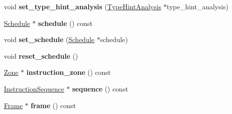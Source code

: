 \begin{DoxyCompactItemize}
\item 
void {\bfseries set\+\_\+type\+\_\+hint\+\_\+analysis} (\hyperlink{classv8_1_1internal_1_1compiler_1_1_type_hint_analysis}{Type\+Hint\+Analysis} $\ast$type\+\_\+hint\+\_\+analysis)\hypertarget{classv8_1_1internal_1_1compiler_1_1_pipeline_data_a51275dd02898936db7e2093a30fa54d7}{}\label{classv8_1_1internal_1_1compiler_1_1_pipeline_data_a51275dd02898936db7e2093a30fa54d7}

\item 
\hyperlink{classv8_1_1internal_1_1compiler_1_1_schedule}{Schedule} $\ast$ {\bfseries schedule} () const \hypertarget{classv8_1_1internal_1_1compiler_1_1_pipeline_data_a116235f2734a371c2fcb21682d3e6599}{}\label{classv8_1_1internal_1_1compiler_1_1_pipeline_data_a116235f2734a371c2fcb21682d3e6599}

\item 
void {\bfseries set\+\_\+schedule} (\hyperlink{classv8_1_1internal_1_1compiler_1_1_schedule}{Schedule} $\ast$schedule)\hypertarget{classv8_1_1internal_1_1compiler_1_1_pipeline_data_a99874eb10ff448f1701bfcc3fa078527}{}\label{classv8_1_1internal_1_1compiler_1_1_pipeline_data_a99874eb10ff448f1701bfcc3fa078527}

\item 
void {\bfseries reset\+\_\+schedule} ()\hypertarget{classv8_1_1internal_1_1compiler_1_1_pipeline_data_a091abf3f2822777e17e242084507ae64}{}\label{classv8_1_1internal_1_1compiler_1_1_pipeline_data_a091abf3f2822777e17e242084507ae64}

\item 
\hyperlink{classv8_1_1internal_1_1_zone}{Zone} $\ast$ {\bfseries instruction\+\_\+zone} () const \hypertarget{classv8_1_1internal_1_1compiler_1_1_pipeline_data_a64c477f3a31097a7a7e492712503cdf9}{}\label{classv8_1_1internal_1_1compiler_1_1_pipeline_data_a64c477f3a31097a7a7e492712503cdf9}

\item 
\hyperlink{classv8_1_1internal_1_1compiler_1_1_instruction_sequence}{Instruction\+Sequence} $\ast$ {\bfseries sequence} () const \hypertarget{classv8_1_1internal_1_1compiler_1_1_pipeline_data_ae3a042cc0f53f7e29bbf5ec40940251e}{}\label{classv8_1_1internal_1_1compiler_1_1_pipeline_data_ae3a042cc0f53f7e29bbf5ec40940251e}

\item 
\hyperlink{classv8_1_1internal_1_1compiler_1_1_frame}{Frame} $\ast$ {\bfseries frame} () const \hypertarget{classv8_1_1internal_1_1compiler_1_1_pipeline_data_a27d305cad632afe9dd9f15d4963e4ae1}{}\label{classv8_1_1internal_1_1compiler_1_1_pipeline_data_a27d305cad632afe9dd9f15d4963e4ae1}


\end{DoxyCompactItemize}

